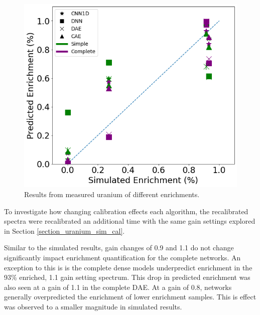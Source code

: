 \begin{figure}[H]
	\centering
	\includegraphics[width=0.8\linewidth]{images/measured_uranium.png}
	\caption{Results from measured uranium of different enrichments.}
	\label{fig:measured_uranium}
\end{figure}

To investigate how changing calibration effects each algorithm, the recalibrated spectra were recalibrated an additional time with the same gain settings explored in Section \ref{section_uranium_sim_cal}. 

Similar to the simulated results, gain changes of 0.9 and 1.1 do not change significantly impact enrichment quantification for the complete networks. An exception to this is is the complete dense models underpredict enrichment in the 93\% enriched, 1.1 gain setting spectrum. This drop in predicted enrichment was also seen at a gain of 1.1 in the complete DAE. At a gain of 0.8, networks generally overpredicted the enrichment of lower enrichment samples. This is effect was observed to a smaller magnitude in simulated results.

